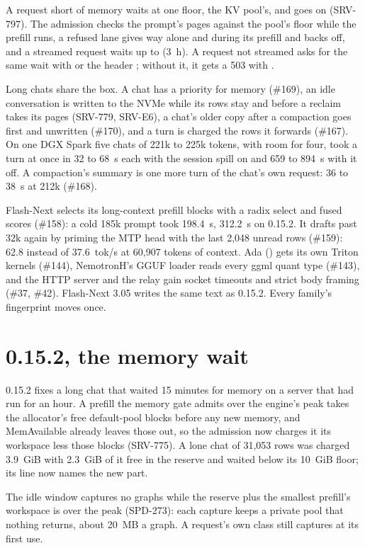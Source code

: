 A request short of memory waits at one floor, the KV pool's, and goes on (SRV-797). The admission checks the prompt's pages against the pool's floor while the prefill runs, a refused lane gives way alone and during its prefill and backs off, and a streamed request waits up to  (3~h). A request not streamed asks for the same wait with  or the header ; without it, it gets a 503 with .

Long chats share the box. A chat has a priority for memory (\#169), an idle conversation is written to the NVMe while its rows stay and before a reclaim takes its pages (SRV-779, SRV-E6), a chat's older copy after a compaction goes first and unwritten (\#170), and a turn is charged the rows it forwards (\#167). On one DGX Spark five chats of 221k to 225k tokens, with room for four, took a turn at once in 32 to 68~s each with the session spill on and 659 to 894~s with it off. A compaction's summary is one more turn of the chat's own request: 36 to 38~s at 212k (\#168).

Flash-Next selects its long-context prefill blocks with a radix select and fused scores (\#158): a cold 185k prompt took 198.4~s, 312.2~s on 0.15.2. It drafts past 32k again by priming the MTP head with the last 2,048 unread rows (\#159): 62.8 instead of 37.6~tok/s at 60,907 tokens of context. Ada () gets its own Triton kernels (\#144), NemotronH's GGUF loader reads every ggml quant type (\#143), and the HTTP server and the relay gain socket timeouts and strict body framing (\#37, \#42). Flash-Next 3.05 writes the same text as 0.15.2. Every family's fingerprint moves once.

\section{0.15.2, the memory wait}\label{sec:changelog-0152}

0.15.2 fixes a long chat that waited 15 minutes for memory on a server that had run for an hour. A prefill the memory gate admits over the engine's peak takes the allocator's free default-pool blocks before any new memory, and MemAvailable already leaves those out, so the admission now charges it its workspace less those blocks (SRV-775). A lone chat of 31,053 rows was charged 3.9~GiB with 2.3~GiB of it free in the reserve and waited below its 10~GiB floor; its line now names the new part.

The idle window captures no graphs while the reserve plus the smallest prefill's workspace is over the peak (SPD-273): each capture keeps a private pool that nothing returns, about 20~MB a graph. A request's own class still captures at its first use.


